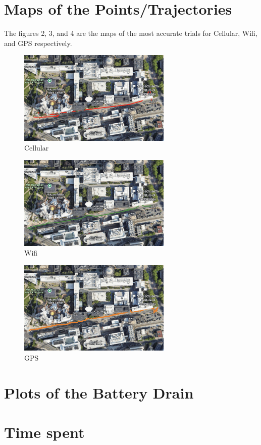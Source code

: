 \documentclass{lab}
\begin{document}
\section{Maps of the Points/Trajectories}

The figures 2, 3, and 4 are the maps of the most accurate trials for Cellular, Wifi, and GPS respectively.

\begin{figure}[h]
\begin{center}
\includegraphics[width=0.65\textwidth]{images/cellular2.png}
\caption{Cellular}
\end{center}
\end{figure}

\begin{figure}[h]
\begin{center}
\includegraphics[width=0.65\textwidth]{images/wifi2.png}
\caption{Wifi}
\end{center}
\end{figure}

\begin{figure}[h]
\begin{center}
\includegraphics[width=0.65\textwidth]{images/gps.png}
\caption{GPS}
\end{center}
\end{figure}

\section{Plots of the Battery Drain}

\section{Time spent}
\end{document}
